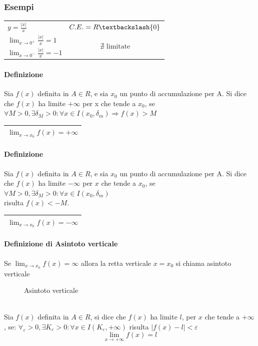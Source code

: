 \subsubsection{Esempi}
\begin{tabular}{lc}
	$y=\frac{|x|}{x}$ & $C.E. = R\textbackslash \{0\}$\\
	$\lim_{x\to 0^+}\frac{|x|}{x}=1$&\multirow{2}{*}{$\nexists \text{ limitate}$} \\
	$\lim_{x\to 0^-}\frac{|x|}{x}=-1$&\\
\end{tabular}
\paragraph{Definizione} Sia $f(x)$ definita in $A \in R$, e sia $x_0$ un punto
di accumulazione per A. Si dice che $f(x)$ ha limite $+\infty$ per x che tende
a $x_0$, se $\forall M>0,\exists \delta_M>0:\forall x \in
I(x_0,\delta_m)\Rightarrow f(x)>M$
\begin{center}
	\begin{tabular}{|l|}
		\hline
		$\lim_{x\to x_0}f(x)=+\infty$\\\hline
	\end{tabular}
\end{center}
\paragraph{Definizione} Sia $f(x)$ definita in $A\in R$, e sia $x_0$ un punto
di accumulazione per A. Si dice che $f(x)$ ha limite $-\infty$ per $x$ che
tende a $x_0$, se $\forall M>0, \exists \delta_M>0:\forall x \in
I(x_0,\delta_m)$\\
risulta $f(x)<-M$.
\begin{center}
	\begin{tabular}{|l|}
		\hline
		$\lim_{x\to x_0}f(x)=-\infty$\\\hline
	\end{tabular}
\end{center}
\paragraph{Definizione di Asintoto verticale}
Se $\boxed{\lim_{x\to x_0}f(x)=\infty}$ allora la retta verticale $\boxed{x=x_0}$
si chiama asintoto verticale
\begin{figure}[!ht]
	\centering
	\caption{Asintoto verticale}
\end{figure}\\
Sia $f(x)$ definita in $A\in R$, si dice che $f(x)$ ha limite $l$, per $x$ che
tende a $+\infty$, se: $\forall_\varepsilon>0, \exists K_\varepsilon >0:\forall
x \in I (K_\varepsilon, +\infty)$ risulta $|f(x)-l|<\varepsilon$
\begin{equation*}
	\boxed{\lim_{x\to+\infty}f(x)=l}
\end{equation*}
\newpage
